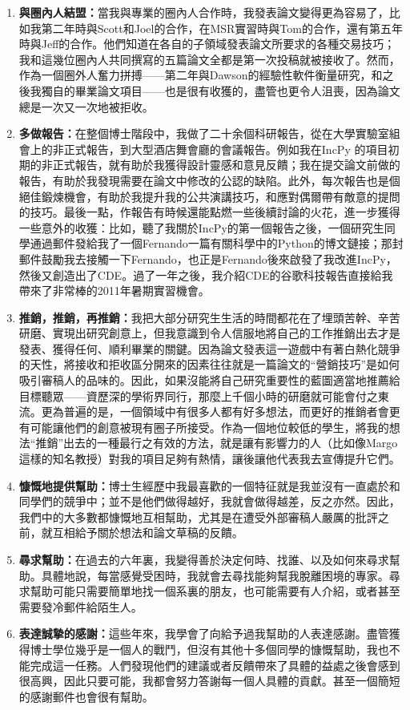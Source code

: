 \documentclass[12pt,UTF8,nofonts]{book}
\begin{document}
\begin{enumerate}
  \item \textbf{與圈內人結盟：}當我與專業的圈內人合作時，我發表論文變得更為容易了，比如我第二年時與Scott和Joel的合作，在MSR實習時與Tom的合作，還有第五年時與Jeff的合作。他們知道在各自的子領域發表論文所要求的各種交易技巧；我和這幾位圈內人共同撰寫的五篇論文全都是第一次投稿就被接收了。然而，作為一個圈外人奮力拼搏——第二年與Dawson的經驗性軟件衡量研究，和之後我獨自的畢業論文項目——也是很有收獲的，盡管也更令人沮喪，因為論文總是一次又一次地被拒收。
  \item \textbf{多做報告：}在整個博士階段中，我做了二十余個科研報告，從在大學實驗室組會上的非正式報告，到大型酒店舞會廳的會議報告。例如我在IncPy 的項目初期的非正式報告，就有助於我獲得設計靈感和意見反饋；我在提交論文前做的報告，有助於我發現需要在論文中修改的公認的缺陷。此外，每次報告也是個絕佳鍛煉機會，有助於我提升我的公共演講技巧，和應對偶爾帶有敵意的提問的技巧。最後一點，作報告有時候還能點燃一些後續討論的火花，進一步獲得一些意外的收獲：比如，聽了我關於IncPy的第一個報告之後，一個研究生同學通過郵件發給我了一個Fernando一篇有關科學中的Python的博文鏈接；那封郵件鼓勵我去接觸一下Fernando，也正是Fernando後來啟發了我改進IncPy，然後又創造出了CDE。過了一年之後，我介紹CDE的谷歌科技報告直接給我帶來了非常棒的2011年暑期實習機會。
  \item \textbf{推銷，推銷，再推銷：}我把大部分研究生生活的時間都花在了埋頭苦幹、辛苦研磨、實現出研究創意上，但我意識到令人信服地將自己的工作推銷出去才是發表、獲得任何、順利畢業的關鍵。因為論文發表這一遊戲中有著白熱化競爭的天性，將接收和拒收區分開來的因素往往就是一篇論文的“營銷技巧”是如何吸引審稿人的品味的。因此，如果沒能將自己研究重要性的藍圖適當地推薦給目標聽眾——資歷深的學術界同行，那麼上千個小時的研磨就可能會付之東流。更為普遍的是，一個領域中有很多人都有好多想法，而更好的推銷者會更有可能讓他們的創意被現有圈子所接受。作為一個地位較低的學生，將我的想法“推銷”出去的一種最行之有效的方法，就是讓有影響力的人（比如像Margo 這樣的知名教授）對我的項目足夠有熱情，讓後讓他代表我去宣傳提升它們。
  \item \textbf{慷慨地提供幫助：}博士生經歷中我最喜歡的一個特征就是我並沒有一直處於和同學們的競爭中；並不是他們做得越好，我就會做得越差，反之亦然。因此，我們中的大多數都慷慨地互相幫助，尤其是在遭受外部審稿人嚴厲的批評之前，就互相給予關於想法和論文草稿的反饋。
  \item \textbf{尋求幫助：}在過去的六年裏，我變得善於決定何時、找誰、以及如何來尋求幫助。具體地說，每當感覺受困時，我就會去尋找能夠幫我脫離困境的專家。尋求幫助可能只需要簡單地找一個系裏的朋友，也可能需要有人介紹，或者甚至需要發冷郵件給陌生人。
  \item \textbf{表達誠摯的感謝：}這些年來，我學會了向給予過我幫助的人表達感謝。盡管獲得博士學位幾乎是一個人的戰鬥，但沒有其他十多個同學的慷慨幫助，我也不能完成這一任務。人們發現他們的建議或者反饋帶來了具體的益處之後會感到很高興，因此只要可能，我都會努力答謝每一個人具體的貢獻。甚至一個簡短的感謝郵件也會很有幫助。

\end{enumerate}
\end{document}
